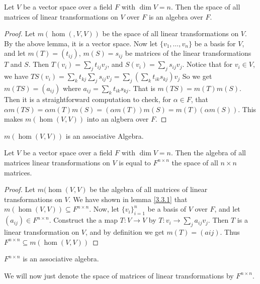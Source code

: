 \begin{theorem}\label{3.3.2}
    Let $V$ be a vector space over a field  $F$ with  $\dim{V}=n$. Then the
    space of all matrices of linear transformations on $V$ over  $F$ is an
    algebra over  $F$.
\end{theorem}
\begin{proof}
    Let $m(\hom{(,V,V)})$ be the space of all linear transformations on $V$. By
    the above lemma, it is a vector space. Now let  $\{v_1, \dots, v_n\}$ be a
    basis for $V$, and let $m(T)=(t_{ij})$, $m(S)=s_{ij}$ be matrices of the
    linear transformations $T$ and  $S$. Then $T(v_i)=\sum_j{t_{ij}v_j}$, and
    $S(v_i)=\sum_j{s_{ij}v_j}$. Notice that for $v_i \in V$, we have
    $TS(v_i)=\sum_k{t_{kj}{\sum_j{s_{ij}v_j}}}=\sum_j{(\sum_k{t_{ik}s_{kj}})v_j}$
    So we get $m(TS)=(a_{ij})$ where $a_{ij}=\sum_k{t_{ik}s_{kj}}$. That is
    $m(TS)=m(T)m(S)$. Then it is a straightforward computation to check, for
    $\alpha \in F$, that  $\alpha m(TS)=\alpha m(T)m(S)=(\alpha
    m(T))m(S)=m(T)(\alpha m(S))$. This makes $m(\hom{(V,V)})$ into an algbera
    over $F$.
\end{proof}
\begin{corollary}
    $m(\hom{(V,V)})$ is an associative Algebra.
\end{corollary}

\begin{lemma}\label{3.3.3}
    Let $V$ be a vector space over a field  $F$ with  $\dim{V}=n$. Then the
    algebra of all matrices linear transformations on $V$ is equal to  $F^{n
    \times n}$ the space of all $n \times n$ matrices.
\end{lemma}
\begin{proof}
    Let $m(\hom{(V,V)}$ be the algebra of all matrices of linear transformations
    on $V$. We have shown in lemma \ref {3.3.1} that $m(\hom{(V,V)}) \subseteq
    F^{n \times n}$. Now, let $\{v_i\}_{i=1}^n$ be a basis of $V$ over  $F$, and
    let  $(a_{ij}) \in F^{n \times n}$. Construct the a map $T:V \rightarrow V$
    by $T:v_i \rightarrow \sum_j{a_{ij}v_j}$. Then $T$ is a linear
    transformation on  $V$, and by definition we get  $m(T)=(a{ij})$. Thus 
    $F^{n \times n} \subseteq m(\hom{(V,V)})$
\end{proof}
\begin{corollary}
    $F^{n \times n}$ is an associative algebra.
\end{corollary}
\begin{remark} 
    We will now just denote the space of matrices of linear transformations by
    $F^{n \times n}$.
\end{remark}

